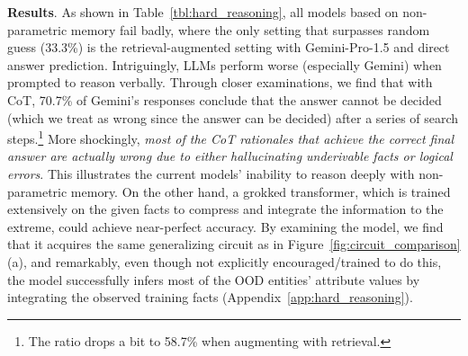 \noindent\textbf{Results}. As shown in Table~\ref{tbl:hard_reasoning}, all models based on non-parametric memory fail badly, where the only setting that surpasses random guess (\num{33.3}\%) is the retrieval-augmented setting with Gemini-Pro-1.5 and direct answer prediction. Intriguingly, LLMs perform worse (especially Gemini) when prompted to reason verbally. Through closer examinations, we find that with CoT, \num{70.7}\% of Gemini's responses conclude that the answer cannot be decided (which we treat as wrong since the answer can be decided) after a series of search steps.\footnote{The ratio drops a bit to \num{58.7}\% when augmenting with retrieval.} More shockingly, \textit{most of the CoT rationales that achieve the correct final answer are actually wrong due to either hallucinating underivable facts or logical errors}. This illustrates the current models' inability to reason deeply with non-parametric memory. On the other hand, a grokked transformer, which is trained extensively on the given facts to compress and integrate the information to the extreme, could achieve near-perfect accuracy. By examining the model, we find that it acquires the same generalizing circuit as in Figure~\ref{fig:circuit_comparison}(a), and remarkably, even though not explicitly encouraged/trained to do this, the model successfully infers most of the OOD entities' attribute values by integrating the observed training facts (Appendix~\ref{app:hard_reasoning}).